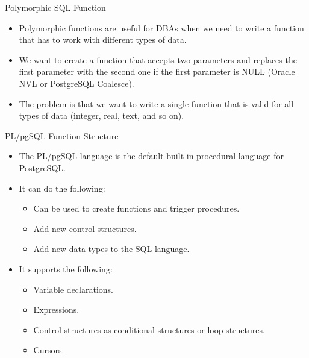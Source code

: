 \documentclass{beamer}
\begin{document}
\begin{frame}{Polymorphic SQL Function}
  \begin{itemize}
    \item Polymorphic functions are useful for DBAs when we need to write a function that has to work with different types of data.
    \item We want to create a function that accepts two parameters and replaces the first parameter with the second one if the first parameter is NULL (Oracle NVL or PostgreSQL Coalesce).
    \item The problem is that we want to write a single function that is valid for all types of data (integer, real, text, and so on).
  \end{itemize}

\end{frame}


\begin{frame}{PL/pgSQL Function Structure}
  \begin{itemize}
    \item The PL/pgSQL language is the default built-in procedural language for PostgreSQL.
    \item It can do the following:
    \begin{itemize}
      \item Can be used to create functions and trigger procedures.
      \item Add new control structures.
      \item Add new data types to the SQL language.
    \end{itemize}
    \item It supports the following:
    \begin{itemize}
      \item Variable declarations.
      \item Expressions.
      \item Control structures as conditional structures or loop structures.
      \item Cursors.
    \end{itemize}
  \end{itemize}
\end{frame}
\end{document}
